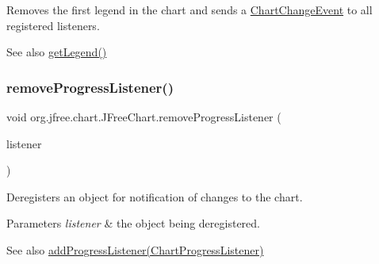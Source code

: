 Removes the first legend in the chart and sends a \mbox{\hyperlink{}{Chart\+Change\+Event}} to all registered listeners.

\begin{DoxySeeAlso}{See also}
\mbox{\hyperlink{classorg_1_1jfree_1_1chart_1_1_j_free_chart_a761aca9a3ee1c8198e055aa03c77a980}{get\+Legend()}} 
\end{DoxySeeAlso}
\mbox{\label{classorg_1_1jfree_1_1chart_1_1_j_free_chart_a4e49f1c4b7ed4328f29cac2c6a4f5a09}} 
\subsubsection{\texorpdfstring{remove\+Progress\+Listener()}{removeProgressListener()}}
{\footnotesize\ttfamily void org.\+jfree.\+chart.\+J\+Free\+Chart.\+remove\+Progress\+Listener (\begin{DoxyParamCaption}\item[{\mbox{\hyperlink{interfaceorg_1_1jfree_1_1chart_1_1event_1_1_chart_progress_listener}{Chart\+Progress\+Listener}}}]{listener }\end{DoxyParamCaption})}

Deregisters an object for notification of changes to the chart.


\begin{DoxyParams}{Parameters}
{\em listener} & the object being deregistered.\\
\hline
\end{DoxyParams}
\begin{DoxySeeAlso}{See also}
\mbox{\hyperlink{classorg_1_1jfree_1_1chart_1_1_j_free_chart_a01fa8b4979ad1166520db31d94b99eb1}{add\+Progress\+Listener(\+Chart\+Progress\+Listener)}} 
\end{DoxySeeAlso}
\mbox{\label{classorg_1_1jfree_1_1chart_1_1_j_free_chart_a8b70d1ac67e20b9d3e4df05cc03cd774}} 
